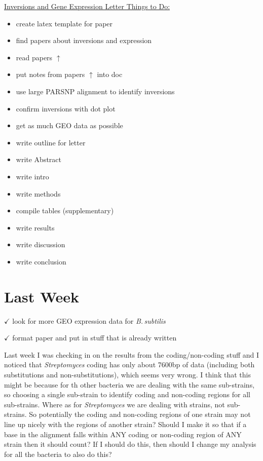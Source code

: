 \documentclass[12pt]{article}
\newcommand{\strep}{\textit{Streptomyces}\xspace}
\newcommand{\bass}{\textit{B.\,subtilis}\xspace}
\begin{document}
\underline{Inversions and Gene Expression Letter Things to Do:}
\begin{itemize}
	\item create latex template for paper
	\item find papers about inversions and expression
	\item read papers $\uparrow$
	\item put notes from papers $\uparrow$ into doc
	\item use large PARSNP alignment to identify inversions
	\item confirm inversions with dot plot
	\item get as much GEO data as possible
	\item write outline for letter
	\item write Abstract
	\item write intro
	\item write methods
	\item compile tables (supplementary)
	\item write results
	\item write discussion
	\item write conclusion 
\end{itemize}




	
\section*{Last Week}

$\checkmark$ look for more GEO expression data for \bass

$\checkmark$ format paper and put in stuff that is already written

Last week I was checking in on the results from the coding/non-coding stuff and I noticed that \strep coding has only about 7600bp of data (including both substitutions and non-substitutions), which seems very wrong.
I think that this might be because for th other bacteria we are dealing with the same sub-strains, so choosing a single sub-strain to identify coding and non-coding regions for all sub-strains.
Where as for \strep we are dealing with strains, not sub-strains. So potentially the coding and non-coding regions of one strain may not line up nicely with the regions of another strain?
Should I make it so that if a base in the alignment falls within ANY coding or non-coding region of ANY strain then it should count?
If I should do this, then should I change my analysis for all the bacteria to also do this?
\end{document}
